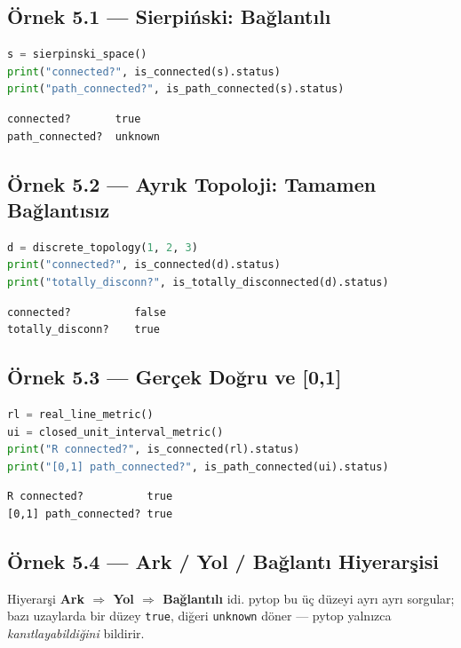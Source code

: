 \subsection*{Örnek 5.1 — Sierpiński: Bağlantılı}

\begin{lstlisting}[language=Python]
s = sierpinski_space()
print("connected?", is_connected(s).status)
print("path_connected?", is_path_connected(s).status)
\end{lstlisting}

\begin{verbatim}
connected?       true
path_connected?  unknown
\end{verbatim}

\subsection*{Örnek 5.2 — Ayrık Topoloji: Tamamen Bağlantısız}

\begin{lstlisting}[language=Python]
d = discrete_topology(1, 2, 3)
print("connected?", is_connected(d).status)
print("totally_disconn?", is_totally_disconnected(d).status)
\end{lstlisting}

\begin{verbatim}
connected?          false
totally_disconn?    true
\end{verbatim}

\subsection*{Örnek 5.3 — Gerçek Doğru ve [0,1]}

\begin{lstlisting}[language=Python]
rl = real_line_metric()
ui = closed_unit_interval_metric()
print("R connected?", is_connected(rl).status)
print("[0,1] path_connected?", is_path_connected(ui).status)
\end{lstlisting}

\begin{verbatim}
R connected?          true
[0,1] path_connected? true
\end{verbatim}

\subsection*{Örnek 5.4 — Ark / Yol / Bağlantı Hiyerarşisi}

Hiyerarşi \textbf{Ark $\Rightarrow$ Yol $\Rightarrow$ Bağlantılı} idi. pytop bu üç
düzeyi ayrı ayrı sorgular; bazı uzaylarda bir düzey \texttt{true}, diğeri
\texttt{unknown} döner --- pytop yalnızca \emph{kanıtlayabildiğini} bildirir.

